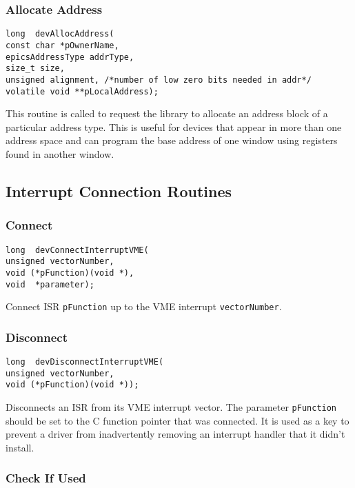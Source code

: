 \subsubsection{Allocate Address}

\begin{verbatim}long  devAllocAddress(
const char *pOwnerName,
epicsAddressType addrType,
size_t size,
unsigned alignment, /*number of low zero bits needed in addr*/
volatile void **pLocalAddress);
\end{verbatim}This routine is called to request the library to allocate an address block of a particular address type. This is useful for 
devices that appear in more than one address space and can program the base address of one window using registers found 
in another window.

\subsection{Interrupt Connection Routines}

\subsubsection{Connect}

\begin{verbatim}long  devConnectInterruptVME(
unsigned vectorNumber,
void (*pFunction)(void *),
void  *parameter);
\end{verbatim}Connect ISR \verb|pFunction| up to the VME interrupt \verb|vectorNumber|.

\subsubsection{Disconnect}

\begin{verbatim}long  devDisconnectInterruptVME(
unsigned vectorNumber,
void (*pFunction)(void *));
\end{verbatim}Disconnects an ISR from its VME interrupt vector. The parameter \verb|pFunction| should be set to the C function pointer 
that was connected. It is used as a key to prevent a driver from inadvertently removing an interrupt handler that it didn't 
install.

\subsubsection{Check If Used}

